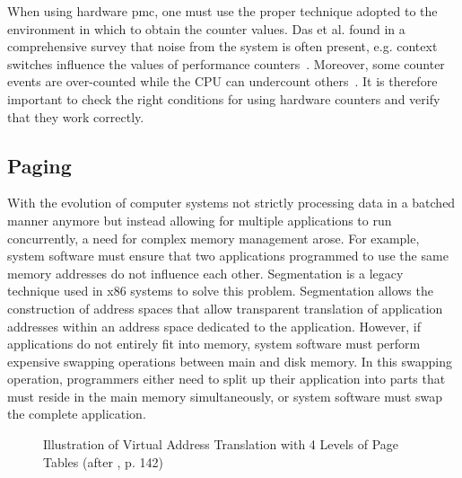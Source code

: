 When using hardware \gls{pmc}, one must use the proper technique adopted to the
environment in which to obtain the counter values. Das et al. found in a
comprehensive survey that noise from the system is often present, e.g. context
switches influence the values of performance counters~\cite{das_sok_2019}.
Moreover, some counter events are over-counted while the CPU can undercount
others~\cite{weaver_non-determinism_2013}. It is therefore important to check the
right conditions for using hardware counters and verify that they work
correctly.

\subsection{Paging}
\label{sec:state:technical:paging}
With the evolution of computer systems not strictly processing data in a batched
manner anymore but instead allowing for multiple applications to run
concurrently, a need for complex memory management arose. For example, system
software must ensure that two applications programmed to use the same memory
addresses do not influence each other. Segmentation is a legacy technique used
in x86 systems to solve this problem. Segmentation allows the construction of
address spaces that allow transparent translation of application addresses
within an address space dedicated to the application. However, if applications
do not entirely fit into memory, system software must perform expensive swapping
operations between main and disk memory. In this swapping operation, programmers
either need to split up their application into parts that must reside in the
main memory simultaneously, or system software must swap the complete
application.\\

\begin{figure}
  \begin{center}
    
    \caption{Illustration of Virtual Address Translation with 4 Levels of Page Tables (after \cite{amd_manual}, p. 142)}
    \label{fig:state:technical:paging}
  \end{center}
\end{figure}

